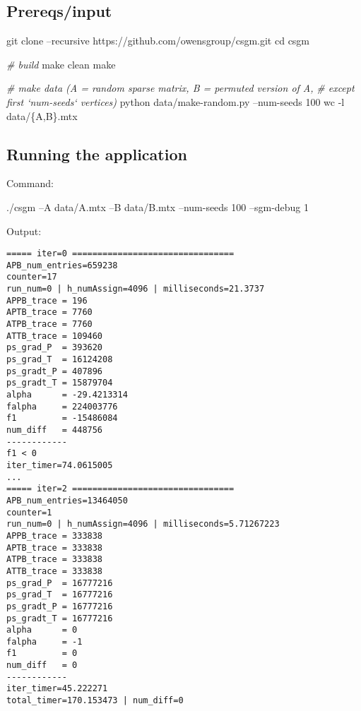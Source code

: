 \documentclass[10pt,oneside]{memoir}
\newenvironment{Shaded}{}{}
\newcommand{\BuiltInTok}[1]{#1}
\newcommand{\CommentTok}[1]{\textcolor[rgb]{0.38,0.63,0.69}{\textit{#1}}}
\newcommand{\DataTypeTok}[1]{\textcolor[rgb]{0.56,0.13,0.00}{#1}}
\newcommand{\ExtensionTok}[1]{#1}
\newcommand{\FunctionTok}[1]{\textcolor[rgb]{0.02,0.16,0.49}{#1}}
\newcommand{\NormalTok}[1]{#1}
\begin{document}
\hypertarget{prereqsinput-7}{%
\subsection{Prereqs/input}\label{prereqsinput-7}}

\begin{Shaded}
\begin{Highlighting}[]
\FunctionTok{git}\NormalTok{ clone --recursive https://github.com/owensgroup/csgm.git}
\BuiltInTok{cd}\NormalTok{ csgm}

\CommentTok{# build}
\FunctionTok{make}\NormalTok{ clean}
\FunctionTok{make}

\CommentTok{# make data (A = random sparse matrix, B = permuted version of A,}
\CommentTok{# except first `num-seeds` vertices)}
\ExtensionTok{python}\NormalTok{ data/make-random.py --num-seeds 100}
\FunctionTok{wc}\NormalTok{ -l data/}\DataTypeTok{\{A,B\}}\NormalTok{.mtx}
\end{Highlighting}
\end{Shaded}

\hypertarget{running-the-application-6}{%
\subsection{Running the application}\label{running-the-application-6}}

Command:

\begin{Shaded}
\begin{Highlighting}[]
\ExtensionTok{./csgm}\NormalTok{ --A data/A.mtx --B data/B.mtx --num-seeds 100 --sgm-debug 1}
\end{Highlighting}
\end{Shaded}

Output:

\begin{verbatim}
===== iter=0 ================================
APB_num_entries=659238
counter=17
run_num=0 | h_numAssign=4096 | milliseconds=21.3737
APPB_trace = 196
APTB_trace = 7760
ATPB_trace = 7760
ATTB_trace = 109460
ps_grad_P  = 393620
ps_grad_T  = 16124208
ps_gradt_P = 407896
ps_gradt_T = 15879704
alpha      = -29.4213314
falpha     = 224003776
f1         = -15486084
num_diff   = 448756
------------
f1 < 0
iter_timer=74.0615005
...
===== iter=2 ================================
APB_num_entries=13464050
counter=1
run_num=0 | h_numAssign=4096 | milliseconds=5.71267223
APPB_trace = 333838
APTB_trace = 333838
ATPB_trace = 333838
ATTB_trace = 333838
ps_grad_P  = 16777216
ps_grad_T  = 16777216
ps_gradt_P = 16777216
ps_gradt_T = 16777216
alpha      = 0
falpha     = -1
f1         = 0
num_diff   = 0
------------
iter_timer=45.222271
total_timer=170.153473 | num_diff=0
\end{verbatim}
\end{document}
